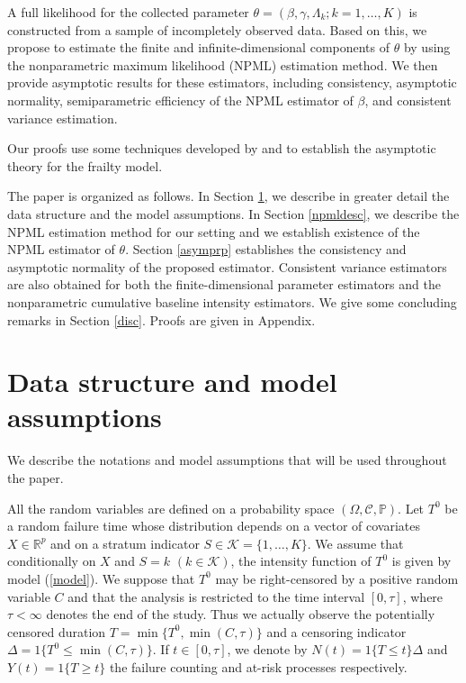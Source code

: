 \documentclass{statsoc}
\begin{document}
A full likelihood for the collected parameter $\theta=(\beta, \gamma, \Lambda_{k}; k=1,\ldots,K)$ is constructed from a sample of incompletely observed data. Based on this, we propose to estimate the finite and infinite-dimensional components of $\theta$ by using the nonparametric maximum likelihood (NPML) estimation method. We then provide asymptotic results for these estimators, including consistency, asymptotic normality, semiparametric efficiency of the NPML estimator of $\beta$, and consistent variance estimation.

Our proofs use some techniques developed by \cite{murphy94,murphy95} and \cite{parner} to establish the asymptotic theory for the frailty model.

The paper is organized as follows. In Section \ref{dataassump}, we describe in greater detail the data structure and the model assumptions. In Section \ref{npmldesc}, we describe the NPML estimation method for our setting and we establish existence of the NPML estimator of $\theta$. Section \ref{asymprp} establishes the consistency and asymptotic normality of the proposed estimator. Consistent variance estimators are also obtained for both the finite-dimensional parameter estimators and the nonparametric cumulative baseline intensity estimators. We give some concluding remarks in Section \ref{disc}. Proofs are given in Appendix.

\section{Data structure and model assumptions}\label{dataassump}

We describe the notations and model assumptions that will be used throughout the paper.

All the random variables are defined on a probability space $(\Omega,\mathcal C, \mathbb P)$. Let $T^0$ be a random failure time whose distribution depends on a vector of covariates $X\in {\ensuremath{\mathbb{R}}}^p$ and on a stratum indicator $S\in\mathcal K=\{1,\ldots,K\}$. We assume that conditionally on $X$ and $S=k$ $(k\in\mathcal K)$, the intensity function of $T^0$ is given by model (\ref{model}). We suppose that $T^0$ may be right-censored by a positive random variable $C$ and that the analysis is restricted to the time interval $[0,\tau]$, where $\tau<\infty$ denotes the end of the study. Thus we actually observe the potentially censored duration $T=\min\{T^0,\min(C,\tau)\}$ and a censoring indicator $\Delta=1\{T^0\leq \min(C,\tau)\}$. If $t\in[0,\tau]$, we denote by $N(t)=1\{T\leq t\}\Delta$ and $Y(t)=1\{T\geq t\}$ the failure counting and at-risk processes respectively.
\end{document}
